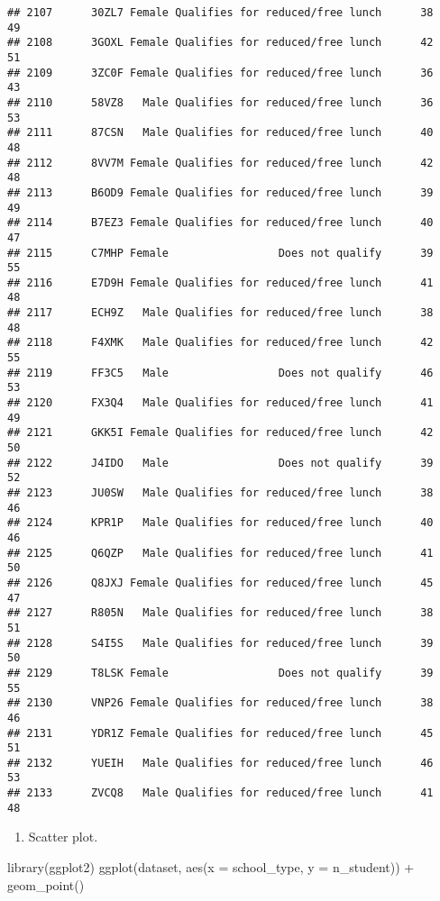 \documentclass[
]{article}
\newenvironment{Shaded}{\begin{snugshade}}{\end{snugshade}}
\newcommand{\AttributeTok}[1]{\textcolor[rgb]{0.77,0.63,0.00}{#1}}
\newcommand{\FunctionTok}[1]{\textcolor[rgb]{0.00,0.00,0.00}{#1}}
\newcommand{\NormalTok}[1]{#1}
\newcommand{\SpecialCharTok}[1]{\textcolor[rgb]{0.00,0.00,0.00}{#1}}
\providecommand{\tightlist}{%
  \setlength{\itemsep}{0pt}\setlength{\parskip}{0pt}}
\begin{document}
\begin{verbatim}
## 2107      30ZL7 Female Qualifies for reduced/free lunch      38       49
## 2108      3GOXL Female Qualifies for reduced/free lunch      42       51
## 2109      3ZC0F Female Qualifies for reduced/free lunch      36       43
## 2110      58VZ8   Male Qualifies for reduced/free lunch      36       53
## 2111      87CSN   Male Qualifies for reduced/free lunch      40       48
## 2112      8VV7M Female Qualifies for reduced/free lunch      42       48
## 2113      B6OD9 Female Qualifies for reduced/free lunch      39       49
## 2114      B7EZ3 Female Qualifies for reduced/free lunch      40       47
## 2115      C7MHP Female                 Does not qualify      39       55
## 2116      E7D9H Female Qualifies for reduced/free lunch      41       48
## 2117      ECH9Z   Male Qualifies for reduced/free lunch      38       48
## 2118      F4XMK   Male Qualifies for reduced/free lunch      42       55
## 2119      FF3C5   Male                 Does not qualify      46       53
## 2120      FX3Q4   Male Qualifies for reduced/free lunch      41       49
## 2121      GKK5I Female Qualifies for reduced/free lunch      42       50
## 2122      J4IDO   Male                 Does not qualify      39       52
## 2123      JU0SW   Male Qualifies for reduced/free lunch      38       46
## 2124      KPR1P   Male Qualifies for reduced/free lunch      40       46
## 2125      Q6QZP   Male Qualifies for reduced/free lunch      41       50
## 2126      Q8JXJ Female Qualifies for reduced/free lunch      45       47
## 2127      R805N   Male Qualifies for reduced/free lunch      38       51
## 2128      S4I5S   Male Qualifies for reduced/free lunch      39       50
## 2129      T8LSK Female                 Does not qualify      39       55
## 2130      VNP26 Female Qualifies for reduced/free lunch      38       46
## 2131      YDR1Z Female Qualifies for reduced/free lunch      45       51
## 2132      YUEIH   Male Qualifies for reduced/free lunch      46       53
## 2133      ZVCQ8   Male Qualifies for reduced/free lunch      41       48
\end{verbatim}

\begin{enumerate}
\def\labelenumi{\arabic{enumi}.}
\setcounter{enumi}{1}
\tightlist
\item
  Scatter plot.
\end{enumerate}

\begin{Shaded}
\begin{Highlighting}[]
\FunctionTok{library}\NormalTok{(ggplot2)}
\FunctionTok{ggplot}\NormalTok{(dataset, }\FunctionTok{aes}\NormalTok{(}\AttributeTok{x =}\NormalTok{ school\_type, }\AttributeTok{y =}\NormalTok{ n\_student)) }\SpecialCharTok{+}
\FunctionTok{geom\_point}\NormalTok{()}
\end{Highlighting}
\end{Shaded}
\end{document}

